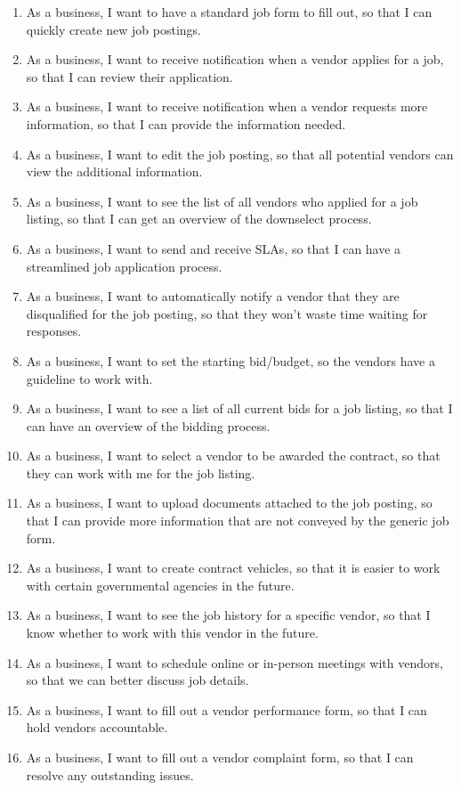 \documentclass[10pt]{article}
\begin{document}
\begin{enumerate}
\item	As a business, I want to have a standard job form to fill out, so that I can quickly create new job postings.
\item	As a business, I want to receive notification when a vendor applies for a job, so that I can review their application.
\item	As a business, I want to receive notification when a vendor requests more information, so that I can provide the information needed.
\item	As a business, I want to edit the job posting, so that all potential vendors can view the additional information.
\item	As a business, I want to see the list of all vendors who applied for a job listing, so that I can get an overview of the downselect process.
\item	As a business, I want to send and receive SLAs, so that I can have a streamlined job application process.
\item	As a business, I want to automatically notify a vendor that they are disqualified for the job posting, so that they won’t waste time waiting for responses.
\item	As a business, I want to set the starting bid/budget, so the vendors have a guideline to work with.
\item	As a business, I want to see a list of all current bids for a job listing, so that I can have an overview of the bidding process.
\item	As a business, I want to select a vendor to be awarded the contract, so that they can work with me for the job listing.
\item	As a business, I want to upload documents attached to the job posting, so that I can provide more information that are not conveyed by the generic job form.
\item	As a business, I want to create contract vehicles, so that it is easier to work with certain governmental agencies in the future.
\item	As a business, I want to see the job history for a specific vendor, so that I know whether to work with this vendor in the future.
\item	As a business, I want to schedule online or in-person meetings with vendors, so that we can better discuss job details.
\item	As a business, I want to fill out a vendor performance form, so that I can hold vendors accountable.
\item	As a business, I want to fill out a vendor complaint form, so that I can resolve any outstanding issues.
	
\end{enumerate}
\end{document}
